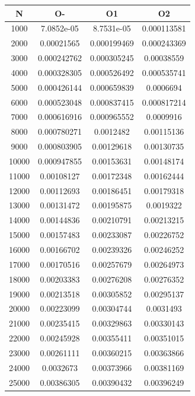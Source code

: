 \begin{center}
\begin{tabular}{| c | c | c | c |}
\hline
\textbf{N} & \textbf{O-} & \textbf{O1} & \textbf{O2} \\ \hline
1000 & 7.0852e-05 & 8.7531e-05 & 0.000113581 \\ \hline
2000 & 0.00021565 & 0.000199469 & 0.000243369 \\ \hline
3000 & 0.000242762 & 0.000305245 & 0.00038559 \\ \hline
4000 & 0.000328305 & 0.000526492 & 0.000535741 \\ \hline
5000 & 0.000426144 & 0.000659839 & 0.0006694 \\ \hline
6000 & 0.000523048 & 0.000837415 & 0.000817214 \\ \hline
7000 & 0.000616916 & 0.000965552 & 0.0009916 \\ \hline
8000 & 0.000780271 & 0.0012482 & 0.00115136 \\ \hline
9000 & 0.000803905 & 0.00129618 & 0.00130735 \\ \hline
10000 & 0.000947855 & 0.00153631 & 0.00148174 \\ \hline
11000 & 0.00108127 & 0.00172348 & 0.00162444 \\ \hline
12000 & 0.00112693 & 0.00186451 & 0.00179318 \\ \hline
13000 & 0.00131472 & 0.00195875 & 0.0019322 \\ \hline
14000 & 0.00144836 & 0.00210791 & 0.00213215 \\ \hline
15000 & 0.00157483 & 0.00233087 & 0.00226752 \\ \hline
16000 & 0.00166702 & 0.00239326 & 0.00246252 \\ \hline
17000 & 0.00170516 & 0.00257679 & 0.00264973 \\ \hline
18000 & 0.00203383 & 0.00276208 & 0.00276352 \\ \hline
19000 & 0.00213518 & 0.00305852 & 0.00295137 \\ \hline
20000 & 0.00223099 & 0.00304744 & 0.0031493 \\ \hline
21000 & 0.00235415 & 0.00329863 & 0.00330143 \\ \hline
22000 & 0.00245928 & 0.00355411 & 0.00351015 \\ \hline
23000 & 0.00261111 & 0.00360215 & 0.00363866 \\ \hline
24000 & 0.0032673 & 0.00373966 & 0.00381169 \\ \hline
25000 & 0.00386305 & 0.00390432 & 0.00396249 \\ \hline

\end{tabular}
\end{center}
